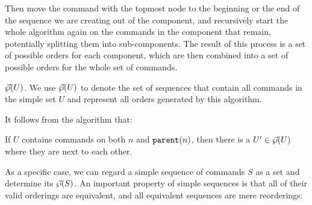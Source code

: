 Then move the command with the topmost node to the beginning or the end of
the sequence we are creating out of the component,
and recursively start the whole algorithm again on the commands in the component that remain,
potentially splitting them into sub-components.
The result of this process is a set of possible orders for each component,
which are then combined into a set of possible orders for the whole set of commands.

\begin{mydef}{$\vec{\wp}({U})$.}
We use $\vec{\wp}({U})$ to denote the set of sequences that contain all commands in
the simple set $U$
and represent all orders generated by this algorithm.
\end{mydef}

It follows from the algorithm that:
\begin{mycor}\label{lemma:neighbor}
If $U$ contains commands on both $n$ and $\mathtt{parent}(n)$, then
there is a $U'\in\vec{\wp}({U})$ where they are next to each other.
\end{mycor}

As a specific case, we can regard a simple sequence of commands $S$
as a set and determine its $\vec{\wp}({S})$.
An important property of simple sequences is that
all of their valid orderings are equivalent,
and all equivalent sequences are mere reorderings:

